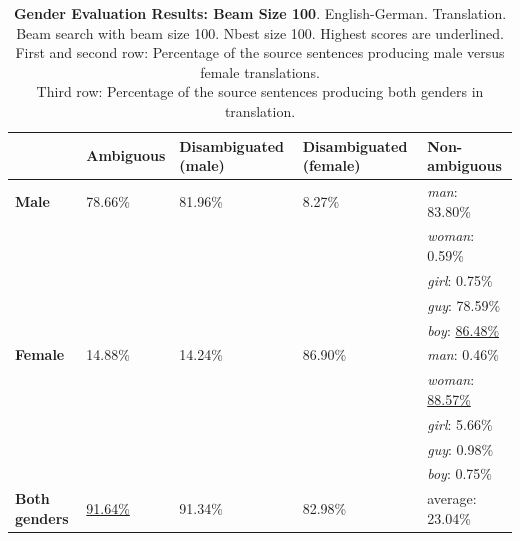 \begin{table} 
    \begin{tabularx}{\linewidth}{|X|XXXX|}
        \hline
         & \textbf{Ambiguous} & \textbf{Disambiguated (male)} & \textbf{Disambiguated (female)} & \textbf{Non-ambiguous} \\ \hline
         \textbf{Male} & 78.66\% & 81.96\% & 8.27\% & \textit{man}: 83.80\% \\
         &&&& \textit{woman}: 0.59\% \\
         &&&& \textit{girl}: 0.75\% \\
         &&&& \textit{guy}: 78.59\% \\
         &&&& \textit{boy}: \underline{86.48\%} \\ \hline
         \textbf{Female} & 14.88\% & 14.24\% & 86.90\% & \textit{man}: 0.46\% \\ 
         &&&& \textit{woman}: \underline{88.57\%} \\
         &&&& \textit{girl}: 5.66\% \\
         &&&& \textit{guy}: 0.98\% \\
         &&&& \textit{boy}: 0.75\% \\\hline
         \textbf{Both genders} & \underline{91.64\%} & 91.34\% & 82.98\% & average: 23.04\% \\ \hline
    \end{tabularx}
    \caption{\textbf{Gender Evaluation Results: Beam Size 100}. English-German. Translation. Beam search with beam size 100. Nbest size 100. Highest scores are underlined. \\ First and second row: Percentage of the source sentences producing male versus female translations. \\ Third row: Percentage of the source sentences producing both genders in translation.}
    \label{tab:gender_percent_100}
\end{table}

